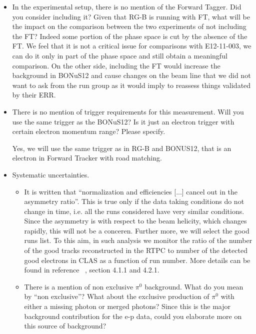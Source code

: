 \begin{itemize}
\item In the experimental setup, there is no mention of the Forward Tagger.  
   Did you consider including it? Given that RG-B is running with FT, what will 
   be the impact on the comparison between the two experiments of not including 
   the FT?
{\color{red} Indeed some portion of the phase space is cut by the absence of 
the FT. We feel that it is not a critical issue for comparisons with 
E12-11-003, we can do it only in part of the phase space and still obtain
a meaningful comparison. On the other side, including the FT would increase the 
background in BONuS12 and cause changes on the beam line that we did not want 
to ask from the run group as it would imply to reassess things validated by 
their ERR.}

\item There is no mention of trigger requirements for this measurement. Will 
   you use the same trigger as the BONuS12? Is it just an electron trigger with 
   certain electron momentum range? Please specify.
  
{\color{red} Yes, we will use the same trigger as in RG-B and BONUS12, that is 
an electron in Forward Tracker with road matching.}

\item Systematic uncertainties.  \begin{itemize}
\item  It is written that ``normalization and efficiencies [...] cancel out in 
   the asymmetry ratio''. This is true only if the data taking conditions do 
      not change in time, i.e. all the runs considered have very similar 
      conditions.\\
{\color{red}Since the asymmetry is with respect to the beam helicity, which 
      changes rapidly, this will not be a conceren. Further more, we will 
      select the good runs list.  To this aim, in such analysis we monitor the 
      ratio of the number of the good tracks reconstructed in the RTPC to 
      number of the detected good electrons in CLAS as a function of run 
      number. More details can be found in reference ~\cite{eg6_note}, section 
      4.1.1 and 4.2.1. }

 \item There is a mention of non exclusive $\pi^0$ background. What do you mean 
    by ``non exclusive''? What about the exclusive production of $\pi^0$ with 
      either a missing photon or merged photons? Since this is the major 
      background contribution for the e-p data, could you elaborate more on 
      this source of background?


\end{itemize}
\end{itemize}
